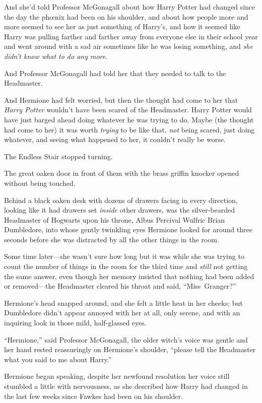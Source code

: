 And she’d told Professor McGonagall about how Harry Potter had changed since the day the phœnix had been on his shoulder, and about how people more and more seemed to see her as just something of Harry’s, and how it seemed like Harry was pulling farther and farther away from everyone else in their school year and went around with a sad air sometimes like he was losing something, and \emph{she didn’t know what to do any more}.

And Professor McGonagall had told her that they needed to talk to the Headmaster.

And Hermione had felt worried, but then the thought had come to her that \emph{Harry Potter} wouldn’t have been scared of the Headmaster. Harry Potter would have just barged ahead doing whatever he was trying to do. Maybe (the thought had come to her) it was worth \emph{trying} to be like that, \emph{not} being scared, just doing whatever, and seeing what happened to her, it couldn’t really be worse.

The Endless Stair stopped turning.

The great oaken door in front of them with the brass griffin knocker opened without being touched.

Behind a black oaken desk with dozens of drawers facing in every direction, looking like it had drawers set \emph{inside} other drawers, was the silver-bearded Headmaster of Hogwarts upon his throne, Albus Percival Wulfric Brian Dumbledore, into whose gently twinkling eyes Hermione looked for around three seconds before she was distracted by all the other things in the room.

Some time later—she wasn’t sure how long but it was while she was trying to count the number of things in the room for the third time and \emph{still} not getting the same answer, even though her memory insisted that nothing had been added or removed—the Headmaster cleared his throat and said,
“Miss~Granger?”

Hermione’s head snapped around, and she felt a little heat in her cheeks; but Dumbledore didn’t appear annoyed with her at all, only serene, and with an inquiring look in those mild, half-glassed eyes.

“Hermione,” said Professor McGonagall, the older witch’s voice was gentle and her hand rested reassuringly on Hermione’s shoulder, “please tell the Headmaster what you said to me about Harry.”

Hermione began speaking, despite her newfound resolution her voice still stumbled a little with nervousness, as she described how Harry had changed in the last few weeks since Fawkes had been on his shoulder.

